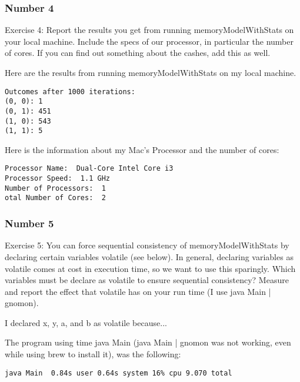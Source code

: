 \documentclass{article}
\theoremstyle{theorem}
\theoremstyle{definition}
\theoremstyle{remark}
\begin{document}
\subsubsection{Number 4}
\noindent\newline Exercise 4: Report the results you get from running memoryModelWithStats on your local machine. Include the specs of our processor, in particular the number of cores. If you can find out something about the cashes, add this as well. 

\noindent\newline\newline Here are the results from running memoryModelWithStats on my local machine.

\begin{verbatim}
Outcomes after 1000 iterations:
(0, 0): 1
(0, 1): 451
(1, 0): 543
(1, 1): 5
\end{verbatim}

\noindent\newline\newline Here is the information about my Mac's Processor and the number of cores:
\begin{verbatim}
Processor Name:  Dual-Core Intel Core i3
Processor Speed:  1.1 GHz
Number of Processors:  1
otal Number of Cores:  2
\end{verbatim}

\subsubsection{Number 5}
\noindent\newline Exercise 5: You can force sequential consistency of memoryModelWithStats by declaring certain variables volatile (see below). In general, declaring variables as volatile comes at cost in execution time, so we want to use this sparingly. Which variables must be declare as volatile to ensure sequential consistency? Measure and report the effect that volatile has on your run time (I use java Main | gnomon).

\noindent\newline I declared x, y, a, and b as volatile because...

\noindent\newline The program using time java Main (java Main | gnomon was not working, even while using brew to install it), was the following:
\begin{verbatim}
java Main  0.84s user 0.64s system 16% cpu 9.070 total
\end{verbatim}
\end{document}
